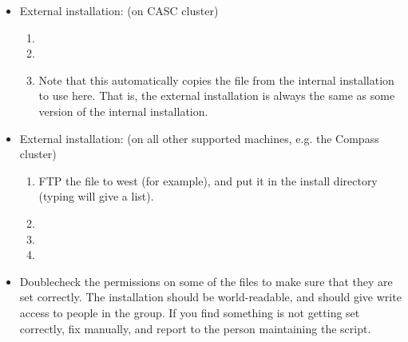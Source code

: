 \begin{itemize}
\item External installation: (on CASC cluster)
\begin{enumerate}

   \item {}

   \item {}

   \item Note that this automatically copies the 
   file from the internal installation to use here.  That is, the
   external installation is always the same as some version of the
   internal installation.

\end{enumerate}

\item External installation: (on all other supported machines,
e.g. the Compass cluster)
\begin{enumerate}

   \item FTP the file  to west (for example), and put it
   in the install directory (typing  will give a list).

   \item {}

   \item {}

   \item {}

\end{enumerate}

\item Doublecheck the permissions on some of the files to make sure that
they are set correctly.  The installation should be world-readable,
and should give write access to people in the  group.  If
you find something is not getting set correctly, fix manually, and
report to the person maintaining the  script.

\end{itemize}


